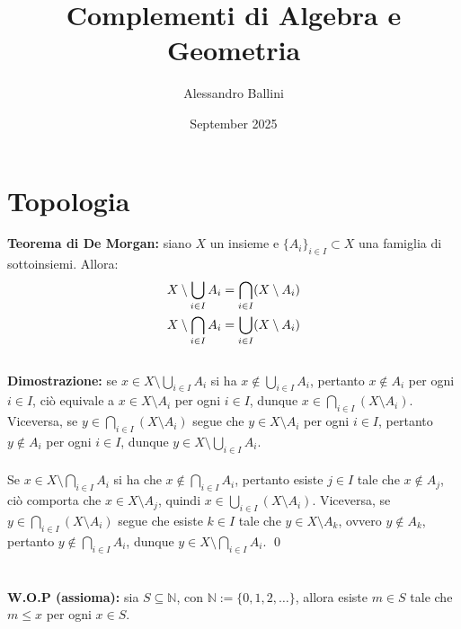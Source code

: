 \documentclass{article}
\title{Complementi di Algebra e Geometria}
\author{Alessandro Ballini}
\date{September 2025}
\begin{document}
\maketitle
\tableofcontents
\newpage
\section{Topologia}
\textbf{Teorema di De Morgan:} siano $X$ un insieme e $\{ A_i \}_{i \in I} \subset X$ una famiglia di sottoinsiemi. Allora:
\begin{gather}
    X \setminus \bigcup_{i \in I} A_i = \bigcap_{i \in I} (X \setminus A_i) \notag \\
    X \setminus \bigcap_{i \in I} A_i = \bigcup_{i \in I} (X \setminus A_i) \notag
\end{gather} \\

\textbf{Dimostrazione:} se $x \in X \setminus \bigcup_{i \in I} A_i$ si ha $x \not\in \bigcup_{i \in I} A_i$, pertanto $x \not\in A_i$ per ogni $i \in I$, ciò equivale a $x \in X \setminus A_i$ per ogni $i \in I$, dunque $x \in \bigcap_{i \in I} (X \setminus A_i)$. Viceversa, se $y \in \bigcap_{i \in I} (X \setminus A_i)$ segue che $y \in X \setminus A_i$ per ogni $i \in I$, pertanto $y \not\in A_i$ per ogni $i \in I$, dunque $y \in X \setminus \bigcup_{i \in I} A_i$. \\ \\
Se $x \in X \setminus \bigcap_{i \in I} A_i$ si ha che $x \not\in \bigcap_{i \in I} A_i$, pertanto esiste $j \in I$ tale che $x \not\in A_j$, ciò comporta che $x \in X \setminus A_j$, quindi $x \in \bigcup_{i \in I} (X \setminus A_i)$. Viceversa, se $y \in \bigcap_{i \in I} (X \setminus A_i)$ segue che esiste $k \in I$ tale che $y \in X \setminus A_k$, ovvero $y \not\in A_k$, pertanto $y \not\in \bigcap_{i \in I} A_i$, dunque $y \in X \setminus \bigcap_{i \in I} A_i$. \qed \\ \\ \\
\textbf{W.O.P (assioma):} sia $S \subseteq \mathbb{N}$, con $\mathbb{N} := \{0, 1, 2, \dots\}$, allora esiste $m \in S$ tale che $m \leq x$ per ogni $x \in S$.
\end{document}
